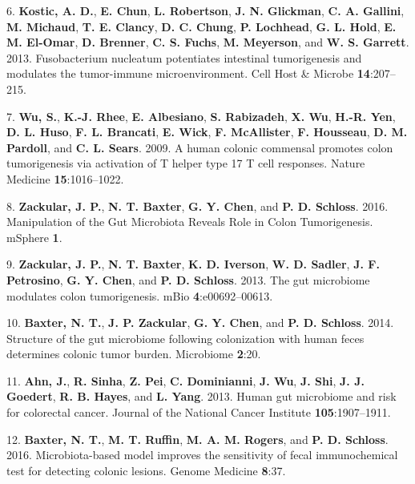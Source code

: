 \documentclass[12pt,]{article}
\begin{document}
\hypertarget{ref-kostic_fusobacterium_2013}{}
6. \textbf{Kostic, A. D.}, \textbf{E. Chun}, \textbf{L. Robertson},
\textbf{J. N. Glickman}, \textbf{C. A. Gallini}, \textbf{M. Michaud},
\textbf{T. E. Clancy}, \textbf{D. C. Chung}, \textbf{P. Lochhead},
\textbf{G. L. Hold}, \textbf{E. M. El-Omar}, \textbf{D. Brenner},
\textbf{C. S. Fuchs}, \textbf{M. Meyerson}, and \textbf{W. S. Garrett}.
2013. Fusobacterium nucleatum potentiates intestinal tumorigenesis and
modulates the tumor-immune microenvironment. Cell Host \& Microbe
\textbf{14}:207--215.

\hypertarget{ref-wu_human_2009}{}
7. \textbf{Wu, S.}, \textbf{K.-J. Rhee}, \textbf{E. Albesiano},
\textbf{S. Rabizadeh}, \textbf{X. Wu}, \textbf{H.-R. Yen}, \textbf{D. L.
Huso}, \textbf{F. L. Brancati}, \textbf{E. Wick}, \textbf{F.
McAllister}, \textbf{F. Housseau}, \textbf{D. M. Pardoll}, and
\textbf{C. L. Sears}. 2009. A human colonic commensal promotes colon
tumorigenesis via activation of T helper type 17 T cell responses.
Nature Medicine \textbf{15}:1016--1022.

\hypertarget{ref-zackular_manipulation_2016}{}
8. \textbf{Zackular, J. P.}, \textbf{N. T. Baxter}, \textbf{G. Y. Chen},
and \textbf{P. D. Schloss}. 2016. Manipulation of the Gut Microbiota
Reveals Role in Colon Tumorigenesis. mSphere \textbf{1}.

\hypertarget{ref-zackular_gut_2013}{}
9. \textbf{Zackular, J. P.}, \textbf{N. T. Baxter}, \textbf{K. D.
Iverson}, \textbf{W. D. Sadler}, \textbf{J. F. Petrosino}, \textbf{G. Y.
Chen}, and \textbf{P. D. Schloss}. 2013. The gut microbiome modulates
colon tumorigenesis. mBio \textbf{4}:e00692--00613.

\hypertarget{ref-baxter_structure_2014}{}
10. \textbf{Baxter, N. T.}, \textbf{J. P. Zackular}, \textbf{G. Y.
Chen}, and \textbf{P. D. Schloss}. 2014. Structure of the gut microbiome
following colonization with human feces determines colonic tumor burden.
Microbiome \textbf{2}:20.

\hypertarget{ref-ahn_human_2013}{}
11. \textbf{Ahn, J.}, \textbf{R. Sinha}, \textbf{Z. Pei}, \textbf{C.
Dominianni}, \textbf{J. Wu}, \textbf{J. Shi}, \textbf{J. J. Goedert},
\textbf{R. B. Hayes}, and \textbf{L. Yang}. 2013. Human gut microbiome
and risk for colorectal cancer. Journal of the National Cancer Institute
\textbf{105}:1907--1911.

\hypertarget{ref-baxter_microbiota-based_2016}{}
12. \textbf{Baxter, N. T.}, \textbf{M. T. Ruffin}, \textbf{M. A. M.
Rogers}, and \textbf{P. D. Schloss}. 2016. Microbiota-based model
improves the sensitivity of fecal immunochemical test for detecting
colonic lesions. Genome Medicine \textbf{8}:37.
\end{document}
